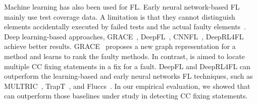 
Machine learning has also been used for FL.  Early neural
network-based FL~\cite{zheng2016fault, briand2007using, zhang2017deep,
  wong2009bp} mainly use test coverage data. A limitation is that they
cannot distinguish elements accidentally executed by failed tests and
the actual faulty elements~\cite{TraPT}.
%
Deep learning-based approaches, GRACE~\cite{lou2021boosting},
DeepFL~\cite{DeepFL}, CNNFL~\cite{zhang2019cnn},
DeepRL4FL~\cite{icse21-fl} achieve better
results. GRACE~\cite{lou2021boosting} proposes a new graph
representation for a method and learns to rank the faulty methods.  In
contrast, {\tool} is aimed to locate multiple CC fixing
statements in a fix for a fault. DeepFL and DeepRL4FL can outperform the
learning-based and early neural networks FL techniques, such as
MULTRIC~\cite{MULTRIC}, TrapT~\cite{TraPT}, and
Fluccs~\cite{sohn2017fluccs}. In our empirical evaluation, we 
showed that {\tool} can outperform those baselines under study in detecting
CC fixing statements.














\iffalse


